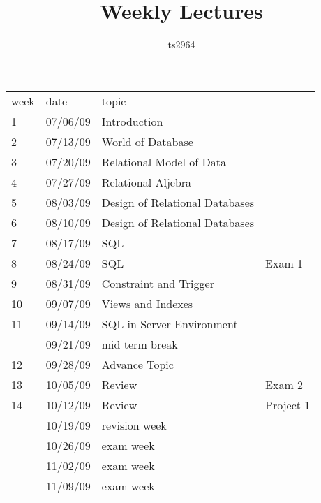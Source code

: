 \documentclass[12pt]{article}
\title{Weekly Lectures}
\author{ts2964}
\date{}
\begin{document}
\maketitle


\begin{tabular}{@{}llll@{}} \toprule			
week	& date & topic & \\ \cmidrule{1-4}	
1	& 07/06/09 & 	Introduction & \\	
2	& 07/13/09 & 	World of Database & \\	
3	& 07/20/09 & 	Relational Model of Data & \\	
4	& 07/27/09	 & Relational Aljebra	& \\ \cmidrule{1-4}
5	& 08/03/09	 & Design of Relational Databases	& \\
6	& 08/10/09	 & Design of Relational Databases	& \\
7	& 08/17/09	 & SQL 	& \\
8	& 08/24/09	 & SQL	& Exam 1 \\
9	& 08/31/09	& Constraint and Trigger & \\	\cmidrule{1-4}
10	& 09/07/09	& Views and Indexes	& \\
11	& 09/14/09	& SQL in Server Environment & \\	
	& 09/21/09	 & mid term break	& \\ 
12	& 09/28/09	 & Advance Topic	& \\ \cmidrule{1-4}
13	& 10/05/09	 & Review	& Exam 2 \\
14	& 10/12/09	 & Review 	& Project 1 \\
	& 10/19/09	 & revision week	& \\
	& 10/26/09	 & exam week	& \\
	& 11/02/09	 & exam week	& \\
	& 11/09/09	 & exam week	& \\ \bottomrule
\end{tabular}
\end{document}
